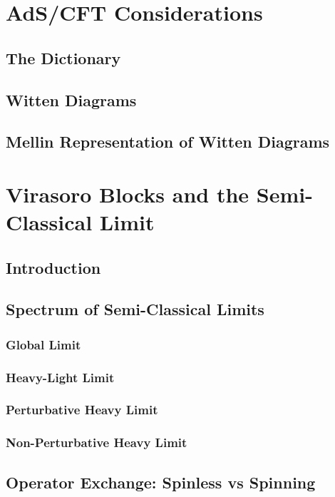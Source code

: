 \documentclass[a4paper,10pt]{article}
\begin{document}
  \section{AdS/CFT Considerations}
  \subsection{The Dictionary}
  \subsection{Witten Diagrams}
  \subsection{Mellin Representation of Witten Diagrams}
  \section{}
  \section{Virasoro Blocks and the Semi-Classical Limit}
  \subsection{Introduction}
  \subsection{Spectrum of Semi-Classical Limits}
  \subsubsection{Global Limit}
  \subsubsection{Heavy-Light Limit}
  \subsubsection{Perturbative Heavy Limit}
  \subsubsection{Non-Perturbative Heavy Limit}
  \subsection{Operator Exchange: Spinless vs Spinning}
\end{document}
